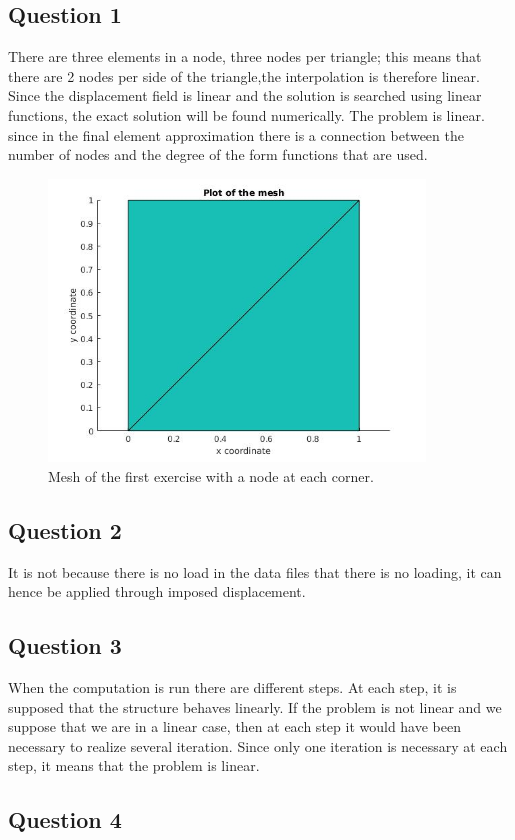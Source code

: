 \documentclass[12pt,a4paper]{article}
\begin{document}
\subsection*{Question 1}
There are three elements in a node, three nodes per triangle; this means that there are 2 nodes per side of the triangle,the interpolation is therefore linear. Since the displacement field is linear and the solution is searched using linear functions, the exact solution will be found numerically. The problem is linear. since in the final element approximation there is a connection between the number of nodes and the degree of the form functions that are used. 

\begin{figure}[h!]
\centering
\includegraphics[width=10cm]{ex1_mesh.jpg}
\caption{Mesh of the first exercise with a node at each corner.}
\end{figure}

\subsection*{Question 2}
It is not because there is no load in the data files that there is no loading, it can hence be applied through imposed displacement. 
\subsection*{Question 3}
When the computation is run there are different steps. At each step, it is supposed that the structure behaves linearly. If the problem is not linear and we suppose that we are in a linear case, then at each step it would have been necessary to realize several iteration. Since only one iteration is necessary at each step, it means that the problem is linear.
\subsection*{Question 4}
\end{document}
